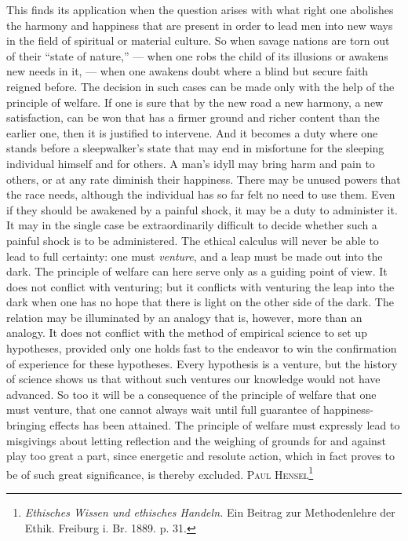 \documentclass[12pt,a4paper,openany]{book}
\newcommand{\opage}[1]{\marginnote{\footnotesize\textit{[#1]}}}
\begin{document}
This finds its application when the question arises with what right one abolishes the harmony and
happiness that are present in order to lead men into new ways in the field of spiritual or material
culture. So when savage nations are torn out of their ``state of nature,'' --- when one robs the child of
its illusions or awakens new needs in it, --- when one awakens doubt where a blind but secure faith reigned
before. The decision in such cases can be made only with the help of the principle of welfare. If one is
sure that by the new road a new harmony, a new satisfaction, can be won that has a firmer ground and richer
content than the earlier one, then it is justified to intervene. And it becomes a duty where one stands
before a sleepwalker's state that may end in misfortune for the sleeping individual himself and for others.
A man's idyll may bring harm and pain to others, or at any rate diminish their happiness. There may be unused
powers that the race needs, although the individual has so far felt no need to use them. Even if they
should be awakened by a painful shock, it may be a duty to administer it. It may in the single case be
extraordinarily difficult to decide whether such a painful shock is to be administered. The ethical
calculus will never be able to lead to full certainty: one must \emph{venture}, and a leap must be made out
into the dark. The principle of welfare can here serve only as a guiding point of view. It does not conflict
with venturing; but it conflicts with venturing the leap into the dark when one has no hope that there is
light on the other side of the dark. The relation may be illuminated by an analogy that is, however, more
than an analogy. It does not conflict with the method of empirical science to set up
\opage{150}hypotheses, provided only one holds fast to the endeavor to win the confirmation of experience for these
hypotheses. Every hypothesis is a venture, but the history of science shows us that without such ventures
our knowledge would not have advanced. So too it will be a consequence of the principle of welfare that one
must venture, that one cannot always wait until full guarantee of happiness-bringing effects has been
attained. The principle of welfare must expressly lead to misgivings about letting reflection and the
weighing of grounds for and against play too great a part, since energetic and resolute action, which in
fact proves to be of such great significance, is thereby excluded. \textsc{Paul Hensel}\footnote[1]{\textit{Ethisches
Wissen und ethisches Handeln.} Ein Beitrag zur Methodenlehre der Ethik. Freiburg i. Br. 1889. p. 31.}
\end{document}
